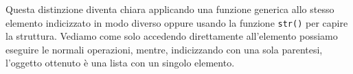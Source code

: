 \documentclass[
]{book}
\newenvironment{Shaded}{\begin{snugshade}}{\end{snugshade}}
\newcommand{\CommentTok}[1]{\textcolor[rgb]{0.56,0.35,0.01}{\textit{#1}}}
\newcommand{\DecValTok}[1]{\textcolor[rgb]{0.00,0.00,0.81}{#1}}
\newcommand{\KeywordTok}[1]{\textcolor[rgb]{0.13,0.29,0.53}{\textbf{#1}}}
\newcommand{\NormalTok}[1]{#1}
\begin{document}
Questa distinzione diventa chiara applicando una funzione generica allo stesso elemento indicizzato in modo diverso oppure usando la funzione \texttt{str()} per capire la struttura. Vediamo come solo accedendo direttamente all'elemento possiamo eseguire le normali operazioni, mentre, indicizzando con una sola parentesi, l'oggetto ottenuto è una lista con un singolo elemento.

\begin{Shaded}
\end{Shaded}
\end{document}
